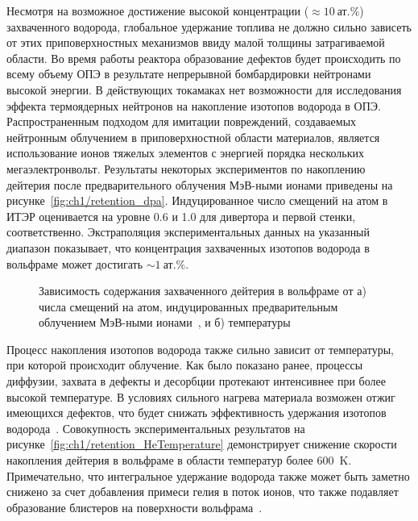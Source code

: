 Несмотря на возможное достижение высокой концентрации (\( \approx \SI{10}{\text{ат.}\percent} \)) захваченного водорода, глобальное удержание топлива не должно сильно зависеть от этих приповерхностных механизмов ввиду малой толщины затрагиваемой области. Во время работы реактора образование дефектов будет происходить по всему объему ОПЭ в результате непрерывной бомбардировки нейтронами высокой энергии. В действующих токамаках нет возможности для исследования эффекта термоядерных нейтронов на накопление изотопов водорода в ОПЭ. Распространенным подходом для имитации повреждений, создаваемых нейтронным облучением в приповерхностной области материалов, является использование ионов тяжелых элементов с энергией порядка нескольких мегаэлектронвольт. Результаты некоторых экспериментов по накоплению дейтерия после предварительного облучения МэВ-ными ионами приведены на рисунке~\cref{fig:ch1/retention_dpa}. Индуцированное число смещений на атом в ИТЭР оценивается на уровне \num{0.6} и \num{1.0} для дивертора и первой стенки, соответственно. Экстраполяция экспериментальных данных на указанный диапазон показывает, что концентрация захваченных изотопов водорода в вольфраме может достигать \( \sim \SI{1}{\text{ат.}\percent} \). 

\begin{figure}[ht]
    \caption{Зависимость содержания захваченного дейтерия в вольфраме от а) числа смещений на атом, индуцированных предварительным облучением МэВ-ными ионами~\cite{Roth2011}, и б) температуры~\cite{Rieth2019}}
\end{figure}

Процесс накопления изотопов водорода также сильно зависит от температуры, при которой происходит облучение. Как было показано ранее, процессы диффузии, захвата в дефекты и десорбции протекают интенсивнее при более высокой температуре. В условиях сильного нагрева материала возможен отжиг имеющихся дефектов, что будет снижать эффективность удержания изотопов водорода~\cite{Dark2024}. Совокупность экспериментальных результатов на рисунке~\cref{fig:ch1/retention_HeTemperature} демонстрирует снижение скорости накопления дейтерия в вольфраме в области температур более \SI{600}{\kelvin}. Примечательно, что интегральное удержание водорода также может быть заметно снижено за счет добавления примеси гелия в поток ионов, что также подавляет образование блистеров на поверхности вольфрама~\cite{Baldwin2011}. 

